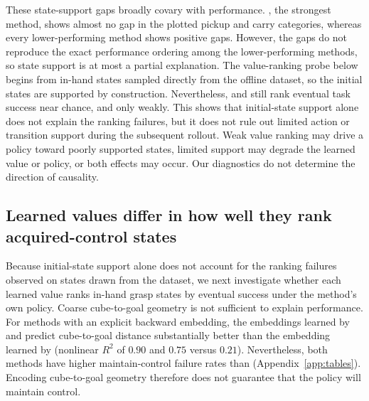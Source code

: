 These state-support gaps broadly covary with performance.
\gciql{}, the strongest method, shows almost no gap in the plotted pickup and carry categories, whereas every lower-performing method shows positive gaps.
However, the gaps do not reproduce the exact performance ordering among the lower-performing methods, so state support is at most a partial explanation.
The value-ranking probe below begins from in-hand states sampled directly from the offline dataset, so the initial states are supported by construction.
Nevertheless, \rldp{} and \psm{} still rank eventual task success near chance, and \fb{} only weakly.
This shows that initial-state support alone does not explain the ranking failures, but it does not rule out limited action or transition support during the subsequent rollout.
Weak value ranking may drive a policy toward poorly supported states, limited support may degrade the learned value or policy, or both effects may occur.
Our diagnostics do not determine the direction of causality.

\subsection{Learned values differ in how well they rank acquired-control states}

Because initial-state support alone does not account for the ranking failures observed on states drawn from the dataset, we next investigate whether each learned value ranks in-hand grasp states by eventual success under the method's own policy.
Coarse cube-to-goal geometry is not sufficient to explain performance.
For methods with an explicit backward embedding, the embeddings learned by \psm{} and \rldp{} predict cube-to-goal distance substantially better than the embedding learned by \fb{} (nonlinear $R^2$ of $0.90$ and $0.75$ versus $0.21$).
Nevertheless, both methods have higher maintain-control failure rates than \fb{} (Appendix~\ref{app:tables}).
Encoding cube-to-goal geometry therefore does not guarantee that the policy will maintain control.


